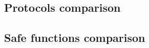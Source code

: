 \subsection{Protocols comparison}\label{subsec:protocols-comparison}

\subsection{Safe functions comparison}\label{subsec:safe-functions-comparison}